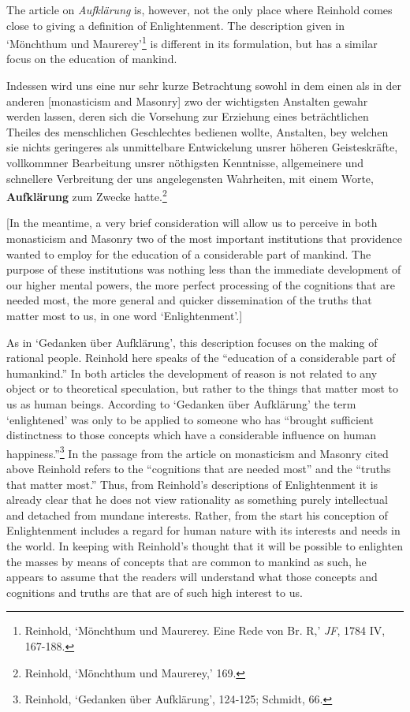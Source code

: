 The article on \textit{Aufkl\"{a}rung} is, however, not the only place where Reinhold comes close to giving a definition of Enlightenment. The description given in `M\"{o}nchthum und Maurerey'\footnote{ Reinhold, `M\"{o}nchthum und Maurerey. Eine Rede von Br. R\textasteriskcentered \textasteriskcentered ,' \textit{JF}, 1784 IV, 167{-}188.} is different in its formulation, but has a similar focus on the education of mankind. 

Indessen wird uns eine nur sehr kurze Betrachtung sowohl in dem einen als in der anderen [monasticism and Masonry] zwo der wichtigsten Anstalten gewahr werden lassen, deren sich die Vorsehung zur Erziehung eines betr\"{a}chtlichen Theiles des menschlichen Geschlechtes bedienen wollte, Anstalten, bey welchen sie nichts geringeres als unmittelbare Entwickelung unsrer h\"{o}heren Geisteskr\"{a}fte, vollkommner Bearbeitung unsrer n\"{o}thigsten Kenntnisse, allgemeinere und schnellere Verbreitung der uns angelegensten Wahrheiten, mit einem Worte, \textbf{Aufkl\"{a}rung} zum Zwecke hatte.\footnote{ Reinhold, `M\"{o}nchthum und Maurerey,' 169.}

[In the meantime, a very brief consideration will allow us to perceive in both monasticism and Masonry two of the most important institutions that providence wanted to employ for the education of a considerable part of mankind. The purpose of these institutions was nothing less than the immediate development of our higher mental powers, the more perfect processing of the cognitions that are needed most, the more general and quicker dissemination of the truths that matter most to us, in one word `Enlightenment'.]

As in `Gedanken \"{u}ber Aufkl\"{a}rung', this description focuses on the making of rational people. Reinhold here speaks of the ``education of a considerable part of humankind.'' In both articles the development of reason is not related to any object or to theoretical speculation, but rather to the things that matter most to us as human beings. According to `Gedanken \"{u}ber Aufkl\"{a}rung' the term `enlightened' was only to be applied to someone who has ``brought sufficient distinctness to those concepts which have a considerable influence on human happiness.''\footnote{ Reinhold, `Gedanken \"{u}ber Aufkl\"{a}rung', 124{-}125; Schmidt, 66.} In the passage from the article on monasticism and Masonry cited above Reinhold refers to the ``cognitions that are needed most'' and the ``truths that matter most.'' Thus, from Reinhold's descriptions of Enlightenment it is already clear that he does not view rationality as something purely intellectual and detached from mundane interests. Rather, from the start his conception of Enlightenment includes a regard for human nature with its interests and needs in the world. In keeping with Reinhold's thought that it will be possible to enlighten the masses by means of concepts that are common to mankind as such, he appears to assume that the readers will understand what those concepts and cognitions and truths are that are of such high interest to us. 

